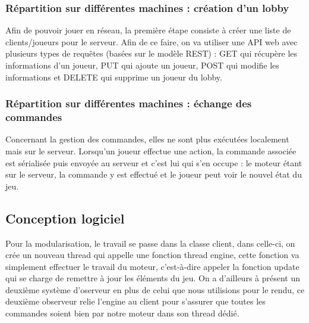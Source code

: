 \documentclass[a4paper,12pt]{article}
\begin{document}
\subsubsection{Répartition sur différentes machines : création d'un lobby}

Afin de pouvoir jouer en réseau, la première étape consiste à créer une liste de clients/joueurs pour le serveur. Afin de ce faire, on va utiliser une API web avec plusieurs types de requêtes (basées sur le modèle REST) : GET qui récupère les informations d'un joueur, PUT qui ajoute un joueur, POST qui modifie les informations et DELETE qui supprime un joueur du lobby.

\subsubsection{Répartition sur différentes machines : échange des commandes}

Concernant la gestion des commandes, elles ne sont plus exécutées localement mais sur le serveur. Lorsqu'un joueur effectue une action,  la commande associée est sérialisée puis envoyée au serveur et c'est lui qui s'en occupe :  le moteur étant sur le serveur, la commande y est effectué et le joueur peut voir le nouvel état du jeu.

\clearpage
\subsection{Conception logiciel}

Pour la modularisation, le travail se passe dans la classe client, dans celle-ci, on crée un nouveau thread qui appelle une fonction thread engine, cette fonction va simplement effectuer le travail du moteur, c'est-à-dire appeler la fonction update qui se charge de remettre à jour les éléments du jeu. On a d'ailleurs à présent un deuxième système d'oserveur en plus de celui que nous utilisions pour le rendu, ce deuxième observeur relie l'engine au client pour s'assurer que toutes les commandes soient bien par notre moteur dans son thread dédié.
\end{document}
